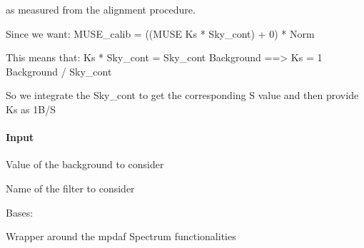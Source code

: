 \documentclass[letterpaper,10pt,english]{sphinxmanual}
\begin{document}
\begin{fulllineitems}
\begin{fulllineitems}
\sphinxAtStartPar
as measured from the alignment procedure.

\sphinxAtStartPar
Since we want:
MUSE\_calib = ((MUSE \sphinxhyphen{} Ks * Sky\_cont) + 0) * Norm

\sphinxAtStartPar
This means that: Ks * Sky\_cont = Sky\_cont \sphinxhyphen{} Background
==\textgreater{} Ks = 1 \sphinxhyphen{} Background / Sky\_cont

\sphinxAtStartPar
So we integrate the Sky\_cont to get the corresponding S value
and then provide Ks as 1\sphinxhyphen{}B/S


\paragraph{Input}
\label{\detokenize{api/pymusepipe:id97}}\begin{description}
\sphinxAtStartPar
Value of the background to consider

\sphinxAtStartPar
Name of the filter to consider

\end{description}

\end{fulllineitems}


\end{fulllineitems}


\begin{fulllineitems}
\label{\detokenize{api/pymusepipe:pymusepipe.mpdaf_pipe.MuseSpectrum}}
\pysigstartsignatures
{}
\pysigstopsignatures
\sphinxAtStartPar
Bases: 

\sphinxAtStartPar
Wrapper around the mpdaf Spectrum functionalities

\end{fulllineitems}

\end{document}
